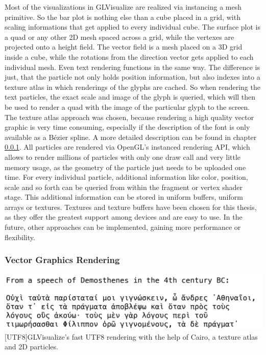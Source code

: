 Most of the visualizations in GLVisualize are realized via instancing a mesh primitive.
So the bar plot is nothing else than a cube placed in a grid, with scaling informations that get applied to every individual cube. The surface plot is a quad or any other 2D mesh spaced across a grid, while the vertexes are projected onto a height field. The vector field is a mesh placed on a 3D grid inside a cube, while the rotations from the direction vector gets applied to each individual mesh. 
Even text rendering functions in the same way. The difference is just, that the particle not only holds position information, but also indexes into a texture atlas in which renderings of the glyphs are cached. So when rendering the text particles, the exact scale and image of the glyph is queried, which will then be used to render a quad with the image of the particular glyph to the screen.
The texture atlas approach was chosen, because rendering a high quality vector graphic is very time consuming, especially if the description of the font is only available as a Bézier spline. A more detailed description can be found in chapter \ref{vector rendering}.
All particles are rendered via \ac{OpenGL}'s instanced rendering API, which allows to render millions of particles with only one draw call and very little memory usage, as the geometry of the particle just needs to be uploaded one time.
For every individual particle, additional information like color, position, scale and so forth can be queried from within the fragment or vertex shader stage.
This additional information can be stored in uniform buffers, uniform arrays or textures. Textures and texture buffers have been chosen for this thesis, as they offer the greatest support among devices and are easy to use. In the future, other approaches can be implemented, gaining more performance or flexibility.


\subsubsection{Vector Graphics Rendering}\label{vector rendering}
\vspace{1em}
\begin{minipage}{\linewidth}
    \centering
    \includegraphics[width=0.9\linewidth]{graphics/utf8.png}
    [UTF8]{GLVisualize's fast UTF8 rendering with the help of Cairo, a texture atlas and 2D particles.}
    \label{fig:UTF8}
\end{minipage}

